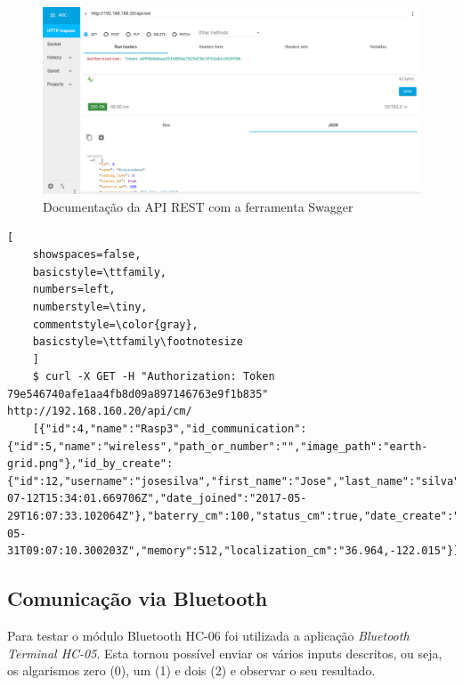 \begin{figure}[h]
	\centering
	\includegraphics[width=0.7\linewidth]{prints-web/API_teste1.png}
	\caption{Documentação da API REST com a ferramenta Swagger}
	\label{testgrap}
\end{figure}







	\begin{lstlisting}[
	showspaces=false,
	basicstyle=\ttfamily,
	numbers=left,
	numberstyle=\tiny,
	commentstyle=\color{gray},
	basicstyle=\ttfamily\footnotesize
	]
	$ curl -X GET -H "Authorization: Token  79e546740afe1aa4fb8d09a897146763e9f1b835" http://192.168.160.20/api/cm/
	[{"id":4,"name":"Rasp3","id_communication":{"id":5,"name":"wireless","path_or_number":"","image_path":"earth-grid.png"},"id_by_create":{"id":12,"username":"josesilva","first_name":"Jose","last_name":"silva","email":"ruipedrooliveira@ua.pt","last_login":"2017-07-12T15:34:01.669706Z","date_joined":"2017-05-29T16:07:33.102064Z"},"baterry_cm":100,"status_cm":true,"date_create":"2017-05-31T09:07:10.300203Z","memory":512,"localization_cm":"36.964,-122.015"}]
	\end{lstlisting}
	
	


\subsection{Comunicação via Bluetooth }


Para testar o módulo Bluetooth HC-06 foi utilizada a aplicação \textit{Bluetooth Terminal HC-05}. Esta tornou possível enviar os vários inputs descritos, ou seja,  os algarismos zero (0), um (1) e dois (2) e observar o seu resultado.  

